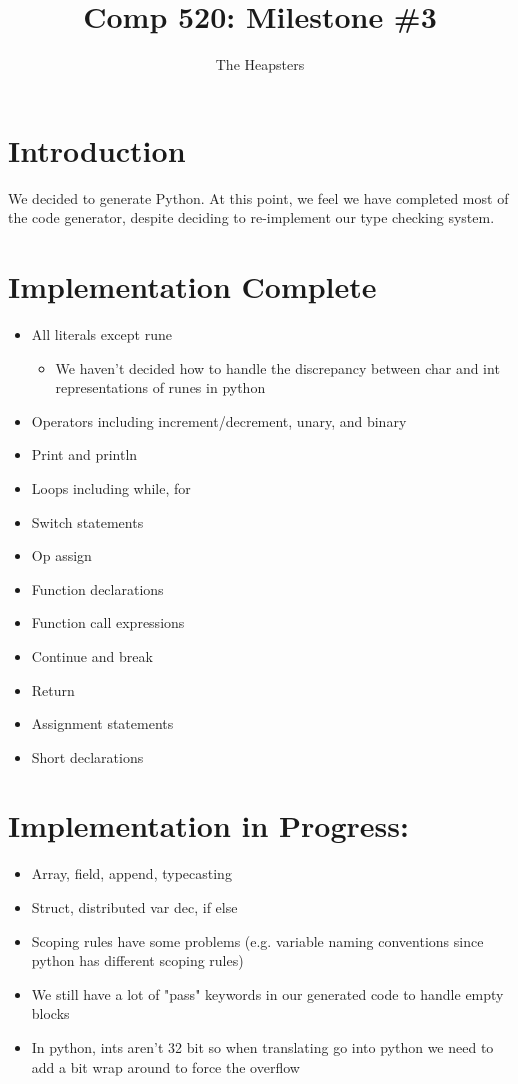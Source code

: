 \documentclass{article}
\title{Comp 520: Milestone \#3}
\author{The Heapsters}
\date{}
\begin{document}
\maketitle

\section{Introduction}

We decided to generate Python. At this point, we feel we have completed most of the code generator, despite deciding to re-implement our type checking system. 

\section{Implementation Complete}
\begin{itemize}
\item All literals except rune
\begin{itemize}
\item We haven't decided how to handle the discrepancy between char and int representations of runes in python
\end{itemize}
\item Operators including increment/decrement, unary, and binary
\item Print and println
\item Loops including while, for
\item Switch statements
\item Op assign
\item Function declarations
\item Function call expressions
\item Continue and break
\item Return
\item Assignment statements
\item Short declarations
\end{itemize}

\section{Implementation in Progress:}
\begin{itemize}
\item Array, field, append, typecasting
\item Struct, distributed var dec, if else
\item Scoping rules have some problems (e.g. variable naming conventions since python has different scoping rules)
\item We still have a lot of "pass" keywords in our generated code to handle empty blocks
\item In python, ints aren't 32 bit so when translating go into python we need to add a bit wrap around to force the overflow
\end{itemize}
\end{document}
